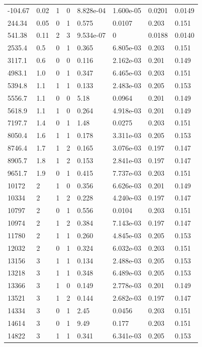 \documentclass[preview]{standalone}
\begin{document}
{{\begin{tabular}{L{1.2cm}C{1.2cm} C{0.3cm}C{0.5cm} C{1.4cm}C{1.4cm} C{1.4cm}C{1.4cm}}
  -104.67  &  0.02  & 1     &  0 &  8.828e-04  & 1.600e-05  & 0.0201 &  0.0149   \\ 
  244.34  &  0.05  & 0     &  1 &  0.575  & 0.0107  & 0.203 &  0.151   \\ 
  541.38  &  0.11  & 2     &  3 &  9.534e-07  & 0  & 0.0188 &  0.0140   \\ 
  2535.4  &   0.5  & 0     &  1 &  0.365  & 6.805e-03  & 0.203 &  0.151   \\ 
  3117.1  &   0.6  & 0     &  0 &  0.116  & 2.162e-03  & 0.201 &  0.149   \\ 
  4983.1  &   1.0  & 0     &  1 &  0.347  & 6.465e-03  & 0.203 &  0.151   \\ 
  5394.8  &   1.1  & 1     &  1 &  0.133  & 2.483e-03  & 0.205 &  0.153   \\ 
  5556.7  &   1.1  & 0     &  0 &  5.18  & 0.0964  & 0.201 &  0.149   \\ 
  5618.9  &   1.1  & 1     &  0 &  0.264  & 4.918e-03  & 0.201 &  0.149   \\ 
  7197.7  &   1.4  & 0     &  1 &  1.48  & 0.0275  & 0.203 &  0.151   \\ 
  8050.4  &   1.6  & 1     &  1 &  0.178  & 3.311e-03  & 0.205 &  0.153   \\ 
  8746.4  &   1.7  & 1     &  2 &  0.165  & 3.076e-03  & 0.197 &  0.147   \\ 
  8905.7  &   1.8  & 1     &  2 &  0.153  & 2.841e-03  & 0.197 &  0.147   \\ 
  9651.7  &   1.9  & 0     &  1 &  0.415  & 7.737e-03  & 0.203 &  0.151   \\ 
  10172  &     2  & 1     &  0 &  0.356  & 6.626e-03  & 0.201 &  0.149   \\ 
  10334  &     2  & 1     &  2 &  0.228  & 4.240e-03  & 0.197 &  0.147   \\ 
  10797  &     2  & 0     &  1 &  0.556  & 0.0104  & 0.203 &  0.151   \\ 
  10974  &     2  & 1     &  2 &  0.384  & 7.143e-03  & 0.197 &  0.147   \\ 
  11780  &     2  & 1     &  1 &  0.260  & 4.845e-03  & 0.205 &  0.153   \\ 
  12032  &     2  & 0     &  1 &  0.324  & 6.032e-03  & 0.203 &  0.151   \\ 
  13156  &     3  & 1     &  1 &  0.134  & 2.488e-03  & 0.205 &  0.153   \\ 
  13218  &     3  & 1     &  1 &  0.348  & 6.489e-03  & 0.205 &  0.153   \\ 
  13366  &     3  & 1     &  0 &  0.149  & 2.778e-03  & 0.201 &  0.149   \\ 
  13521  &     3  & 1     &  2 &  0.144  & 2.682e-03  & 0.197 &  0.147   \\ 
  14334  &     3  & 0     &  1 &  2.45  & 0.0456  & 0.203 &  0.151   \\ 
  14614  &     3  & 0     &  1 &  9.49  & 0.177  & 0.203 &  0.151   \\ 
  14822  &     3  & 1     &  1 &  0.341  & 6.341e-03  & 0.205 &  0.153   \\ 
\hline 
\end{tabular} 

}}
\end{document}
